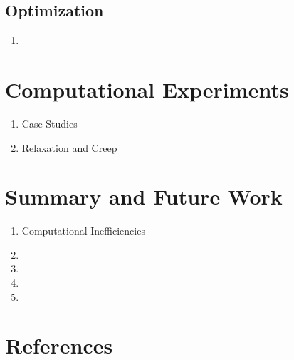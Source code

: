 \documentclass[11pt]{article}
\begin{document}
\subsection{Optimization}
	\begin{enumerate}
		\item
	\end{enumerate}

		
\section{Computational Experiments}
	\begin{enumerate}

		\item Case Studies
		
		\item Relaxation and Creep
		
	\end{enumerate}
	
	
		
\section{Summary and Future Work}
	\begin{enumerate}
	
		
		
		\item Computational Inefficiencies 
				
		\item 
		
		\item 
		
		\item 
		
		\item 
		
	\end{enumerate}
	
	\section{References}
		

	
\end{document}
